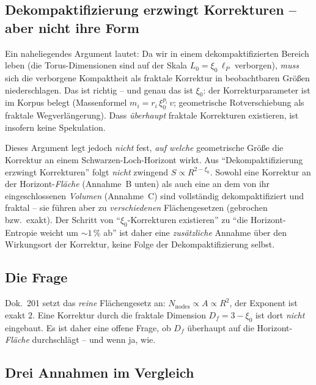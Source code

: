 \subsection*{Dekompaktifizierung erzwingt Korrekturen -- aber nicht ihre Form}

Ein naheliegendes Argument lautet: Da wir in einem dekompaktifizierten
Bereich leben (die Torus-Dimensionen sind auf der Skala $L_0 =
\xi_0\,\ell_P$ verborgen), \emph{muss} sich die verborgene Kompaktheit als
fraktale Korrektur in beobachtbaren Größen niederschlagen. Das ist richtig --
und genau das ist $\xi_0$: der Korrekturparameter ist im Korpus belegt
(Massenformel $m_i = r_i\,\xi_0^{p_i}\,v$; geometrische Rotverschiebung als
fraktale Wegverlängerung). Dass \emph{überhaupt} fraktale Korrekturen
existieren, ist insofern keine Spekulation.

\medskip

\noindent
Dieses Argument legt jedoch \emph{nicht} fest, \emph{auf welche} geometrische
Größe die Korrektur an einem Schwarzen-Loch-Horizont wirkt. Aus
\enquote{Dekompaktifizierung erzwingt Korrekturen} folgt \emph{nicht}
zwingend $S \propto R^{2-\xi_0}$. Sowohl eine Korrektur an der
Horizont-\emph{Fläche} (Annahme~B unten) als auch eine an dem von ihr
eingeschlossenen \emph{Volumen} (Annahme~C) sind vollständig dekompaktifiziert
und fraktal -- sie führen aber zu \emph{verschiedenen} Flächengesetzen
(gebrochen bzw.\ exakt). Der Schritt von \enquote{$\xi_0$-Korrekturen
existieren} zu \enquote{die Horizont-Entropie weicht um $\sim 1\,\%$ ab} ist
daher eine \emph{zusätzliche} Annahme über den Wirkungsort der Korrektur,
keine Folge der Dekompaktifizierung selbst.

\subsection*{Die Frage}

Dok.~201 setzt das \emph{reine} Flächengesetz an: $N_{\text{nodes}} \propto A
\propto R^2$, der Exponent ist exakt $2$. Eine Korrektur durch die fraktale
Dimension $D_f = 3 - \xi_0$ ist dort \emph{nicht} eingebaut. Es ist daher
eine offene Frage, ob $D_f$ überhaupt auf die Horizont-\emph{Fläche}
durchschlägt -- und wenn ja, wie.

\subsection*{Drei Annahmen im Vergleich}

